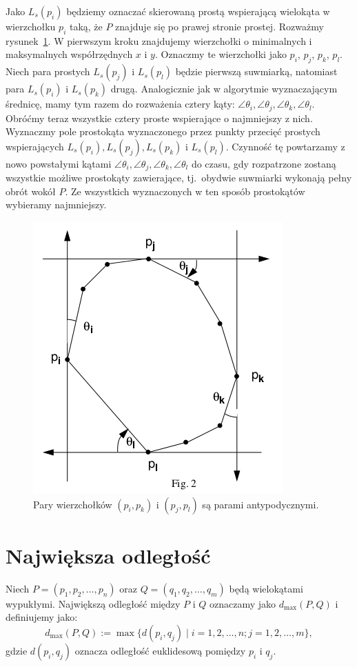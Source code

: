 Jako $L_s(p_i)$ będziemy oznaczać skierowaną prostą wspierającą
wielokąta w wierzchołku $p_i$ taką, że $P$ znajduje się po prawej
stronie prostej. Rozważmy rysunek~\ref{img:calipers2}. W pierwszym
kroku znajdujemy wierzchołki o minimalnych i maksymalnych
współrzędnych $x$ i $y$. Oznaczmy te wierzchołki jako $p_i$, $p_j$,
$p_k$, $p_l$. Niech para prostych $L_s(p_j)$ i $L_s(p_l)$ będzie
pierwszą suwmiarką, natomiast para $L_s(p_i)$ i $L_s(p_k)$
drugą. Analogicznie jak w algorytmie wyznaczającym średnicę, mamy tym
razem do rozważenia cztery kąty: $\angle{\theta_i}, \angle{\theta_j},
\angle{\theta_k}, \angle{\theta_l}$. Obróćmy teraz wszystkie cztery
proste wspierające o najmniejszy z nich. Wyznaczmy pole prostokąta
wyznaczonego przez punkty przecięć prostych wspierających $L_s(p_i),
L_s(p_j), L_s(p_k)$ i $L_s(p_l)$. Czynność tę powtarzamy z nowo
powstałymi kątami $\angle{\theta_i}, \angle{\theta_j},
\angle{\theta_k}, \angle{\theta_l}$ do czasu, gdy rozpatrzone zostaną
wszystkie możliwe prostokąty zawierające, tj.\ obydwie suwmiarki
wykonają pełny obrót wokół $P$. Ze wszystkich wyznaczonych w ten
sposób prostokątów wybieramy najmniejszy.

\begin{figure}[tb]
  \centering
  \includegraphics[scale=0.5]{img/calipers2}
  \caption{\label{img:calipers2} Pary wierzchołków $(p_i, p_k)$ i
    $(p_j, p_l)$ są parami antypodycznymi.}
\end{figure}

\section{Największa odległość\label{sec:max_dist}}
\begin{problem}
  Niech $P = (p_1, p_2, \ldots, p_n)$ oraz $Q = (q_1, q_2, \ldots,
  q_m)$ będą wielokątami wypukłymi. Największą odległość między $P$ i
  $Q$ oznaczamy jako $d_{\max}(P, Q)$ i definiujemy
  jako: $$d_{\max}(P, Q) := \max{\{ d(p_i, q_j) \mid i = 1, 2, \ldots,
    n; j = 1, 2, \ldots, m \}},$$ gdzie $d(p_i, q_j)$ oznacza
  odległość euklidesową pomiędzy $p_i$ i $q_j$.
\end{problem}

